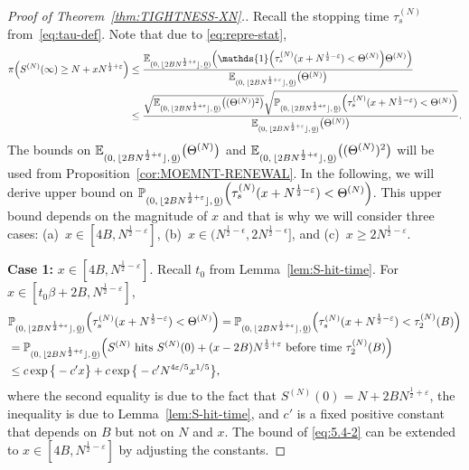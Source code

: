 \documentclass[11pt, reqno]{article}
\DeclarePairedDelimiter\autobracket{(}{)}
\newcommand{\br}[1]{\autobracket*{#1}}
\numberwithin{equation}{section}
\numberwithin{theorem}{section}
\newcommand\blue[1]{#1}
\begin{document}
\begin{proof}[Proof of Theorem~\ref{thm:TIGHTNESS-XN}.]
Recall the stopping time $\tau^{(N)}_s$ from~\eqref{eq:tau-def}.
Note that due to \eqref{eq:repre-stat},
\begin{align}\label{eq:5.4-1}
    \pi\br{\textcolor{black}{S^{(N)}(\infty)} \geq N+xN^{\frac{1}{2}+\varepsilon}}&\leq \frac{\mathbb{E}_{(0, \, \lfloor 2BN^{\frac{1}{2}+\varepsilon} \rfloor, \,\underline{0})}\br{\mathds{1}\br{\tau^{(N)}_s(x+N^{\frac{1}{2}-\varepsilon})<\Theta^{(N)} }\Theta^{(N)}}}{\mathbb{E}_{(0, \, \lfloor 2BN^{\frac{1}{2}+\varepsilon} \rfloor, \,\underline{0})}\br{\Theta^{(N)} }}\nonumber\\
    &\leq \frac{\sqrt{\mathbb{E}_{(0, \, \lfloor 2BN^{\frac{1}{2}+\varepsilon} \rfloor, \,\underline{0})}\br{(\Theta^{(N)})^2}}\sqrt{\mathbb{P}_{(0, \, \lfloor 2BN^{\frac{1}{2}+\varepsilon} \rfloor, \,\underline{0})}\br{\tau^{(N)}_s(x+N^{\frac{1}{2}-\varepsilon})<\Theta^{(N)} }}}{\mathbb{E}_{(0, \, \lfloor 2BN^{\frac{1}{2}+\varepsilon} \rfloor, \,\underline{0})}\br{\Theta^{(N)} }}.
\end{align}
The bounds on $\mathbb{E}_{(0, \, \lfloor 2BN^{\frac{1}{2}+\varepsilon} \rfloor, \,\underline{0})}\br{\Theta^{(N)} }$ and $\mathbb{E}_{(0, \, \lfloor 2BN^{\frac{1}{2}+\varepsilon} \rfloor, \,\underline{0})}\br{(\Theta^{(N)})^2}$ will be used from Proposition~\ref{cor:MOEMNT-RENEWAL}. In the following, we will derive upper bound on $\mathbb{P}_{(0, \, \lfloor 2BN^{\frac{1}{2}+\varepsilon} \rfloor, \,\underline{0})}\br{\tau^{(N)}_s(x+N^{\frac{1}{2}-\varepsilon})<\Theta^{(N)} }$.
\blue{This upper bound depends on the magnitude of $x$ and that is why we will consider three cases: (a)~$x\in [4B, N^{\frac{1}{2}-\varepsilon}]$,  (b)~$x \in (N^{\frac{1}{2} - \epsilon}, 2N^{\frac{1}{2} - \epsilon}]$, and (c)~$x\geq 2N^{\frac{1}{2}-\varepsilon}$.}

\noindent
\blue{\textbf{Case 1:}} $x\in [4B, N^{\frac{1}{2}-\varepsilon}]$.
Recall $t_0$ from Lemma~\ref{lem:S-hit-time}. For $x\in [t_0\beta + 2B, N^{\frac{1}{2}-\varepsilon}]$,
\begin{align}\label{eq:5.4-2}
    &\mathbb{P}_{(0, \, \lfloor 2BN^{\frac{1}{2}+\varepsilon} \rfloor, \,\underline{0})}\br{\tau^{(N)}_s(x+N^{\frac{1}{2}-\varepsilon})<\Theta^{(N)} }
    =\mathbb{P}_{(0, \, \lfloor 2BN^{\frac{1}{2}+\varepsilon} \rfloor, \,\underline{0})}\br{\tau^{(N)}_s(x+N^{\frac{1}{2}-\varepsilon})<\tau^{(N)}_2(B)}\nonumber\\
    &= \mathbb{P}_{(0, \, \lfloor 2BN^{\frac{1}{2}+\varepsilon} \rfloor, \,\underline{0})}\br{S^{(N)} \text{ hits } S^{(N)}(0) + (x-2B)N^{\frac{1}{2}+\varepsilon} \text{ before time }\tau^{(N)}_2(B)}\nonumber\\
    & \leq  c\exp\big\{-c'x\big\}+c\exp\big\{-c'N^{4\varepsilon/5}x^{1/5}\big\},
\end{align}
where
the second equality is due to the fact that $S^{(N)}(0) = N + 2BN^{\frac{1}{2}+\varepsilon}$,
the inequality is due to Lemma~\ref{lem:S-hit-time}, and $c'$ is a fixed positive constant that depends on $B$ but not on $N$ and $x$. 
The bound of \eqref{eq:5.4-2} can be extended to $x\in[4B,N^{\frac{1}{2}-\varepsilon}]$ by adjusting the constants. 


\end{proof}
\end{document}

